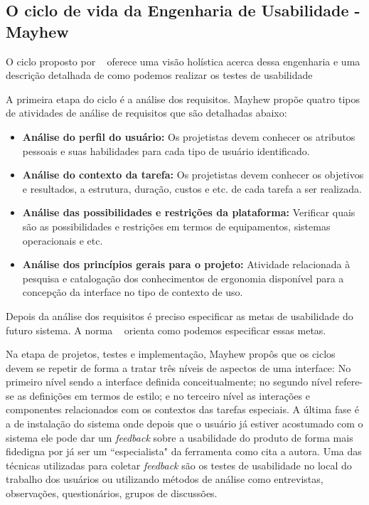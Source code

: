 \subsection{O ciclo de vida da Engenharia de Usabilidade - Mayhew}

	O ciclo proposto por ~ oferece uma visão holística acerca dessa engenharia e uma descrição detalhada de como podemos realizar os testes de usabilidade %

	A primeira etapa do ciclo é a análise dos requisitos. Mayhew propõe quatro tipos de atividades de análise de requisitos que são detalhadas abaixo:

\begin{itemize}
\item \textbf{Análise do perfil do usuário:} Os projetistas devem conhecer os atributos pessoais e suas habilidades para cada tipo de usuário identificado. 
	
\item \textbf{Análise do contexto da tarefa:} Os projetistas devem conhecer os objetivos e resultados, a estrutura, duração, custos e etc. de cada tarefa a ser realizada.

\item \textbf{Análise das possibilidades e restrições da plataforma:} Verificar quais são as possibilidades e restrições em termos de equipamentos, sistemas operacionais e etc.

\item \textbf{Análise dos princípios gerais para o projeto:} Atividade relacionada à pesquisa e catalogação dos conhecimentos de ergonomia disponível para a concepção da interface no tipo de contexto de uso.

\end{itemize}

	Depois da análise dos requisitos é preciso especificar as metas de usabilidade do futuro sistema. A norma ~ orienta como podemos especificar essas metas.

	Na etapa de projetos, testes e implementação, Mayhew propôs que os ciclos devem se repetir de forma a tratar três níveis de aspectos de uma interface: No primeiro nível sendo a interface definida conceitualmente; no segundo nível refere-se as definições em termos de estilo; e no terceiro nível as interações e componentes relacionados com os contextos das tarefas especiais. A última fase é a de instalação do sistema onde depois que o usuário já estiver acostumado com o sistema ele pode dar um \textit{feedback} sobre a usabilidade do produto de forma mais fidedigna por já ser um ``especialista" da ferramenta como cita a autora. 
%
	Uma das técnicas utilizadas para coletar \textit{feedback} são os testes de usabilidade no local do trabalho dos usuários ou utilizando métodos de análise como entrevistas, observações, questionários, grupos de discussões. 

